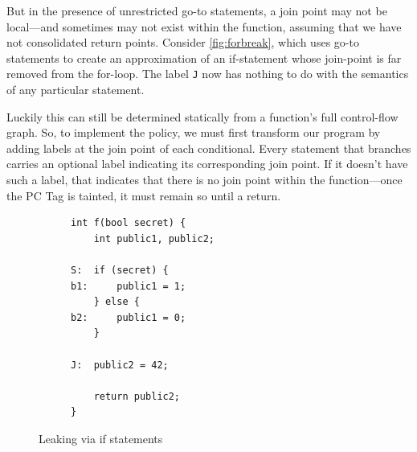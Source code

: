\documentclass[acmsmall,review,anonymous]{acmart}\settopmatter{printfolios=true,printccs=false,printacmref=false}
\begin{document}
But in the presence of unrestricted go-to statements, a join point may not be
local---and sometimes may not exist within the function, assuming that we have not
consolidated return points. Consider \cref{fig:forbreak}, which
uses go-to statements to create an approximation of an if-statement whose join-point
is far removed from the for-loop. The label {\tt J} now has nothing to do with the
semantics of any particular statement.

Luckily this can still be determined statically from a function's full
control-flow graph. So, to implement the policy, we must first transform our program
by adding labels at the join point of each conditional.
Every statement that branches carries an optional label indicating its corresponding
join point. If it doesn't have such
a label, that indicates that there is no join point within the function---once the PC Tag is tainted,
it must remain so until a return.

\begin{figure}
  \begin{subfigure}{0.5\textwidth}
\begin{verbatim}
int f(bool secret) {
    int public1, public2;

S:  if (secret) {
b1:     public1 = 1;
    } else {
b2:     public1 = 0;
    }

J:  public2 = 42;

    return public2;
}
\end{verbatim}
  \end{subfigure}
  \begin{subfigure}{0.5\textwidth}
  \end{subfigure}
  
  \caption{Leaking via if statements}
  \label{fig:ifthenelse}
\end{figure}
\end{document}
